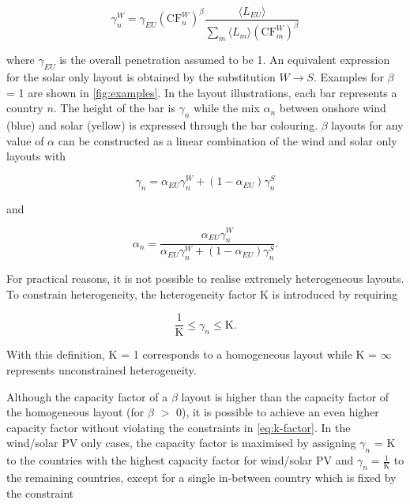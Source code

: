 \documentclass[a4paper, 5p, sort&compress]{elsarticle}%
\newcommand{\paren}[1]{\left(#1\right)}
\begin{document}
\begin{equation}
  \label{eq:8}
  \gamma_{n}^{W} = \gamma_{EU} \paren{\text{CF}^{W}_{n}}^{\beta} \frac{\langle L_{EU}
    \rangle}{\sum_{m} \langle L_{m}
    \rangle \paren{\text{CF}^{W}_{m}}^{\beta}}
\end{equation}

where $\gamma_{EU}$ is the overall penetration assumed to be 1. An equivalent
expression for the solar only layout is obtained by the substitution
$W \to S$. Examples for $\beta$ = 1 are shown in \cref{fig:examples}. In
the layout illustrations, each bar represents a country $n$. The
height of the bar is $\gamma_{n}$ while the mix $\alpha_{n}$ between onshore
wind (blue) and solar (yellow) is expressed through the bar
colouring. $\beta$ layouts for any value of $\alpha$ can be constructed as a
linear combination of the wind and solar only layouts with


\begin{equation}
  \label{eq:9}
  \gamma_{n} = \alpha_{EU} \gamma^{W}_{n} + (1-\alpha_{EU}) \gamma^{S}_{n} 
\end{equation}

and

\begin{equation}
  \label{eq:9}
  \alpha_{n} = \frac{\alpha_{EU} \gamma_{n}^{W}}{\alpha_{EU} \gamma_{n}^{W} + (1-\alpha_{EU}) \gamma_{n}^{S}} .
\end{equation}


For practical reasons, it is not possible to realise extremely
heterogeneous layouts. To constrain heterogeneity, the heterogeneity
factor K is introduced by requiring

\begin{equation}
  \label{eq:k-factor}
  \frac{1}{\text{K}} \leq \gamma_{n} \leq \text{K} .
\end{equation}

With this definition, K = 1 corresponds to a homogeneous layout while
K = $\infty$ represents unconstrained heterogeneity.

Although the capacity factor of a $\beta$ layout is higher than the
capacity factor of the homogeneous layout (for $\beta$ $>$ 0), it is
possible to achieve an even higher capacity factor without violating
the constraints in \cref{eq:k-factor}. In the wind/solar PV only
cases, the capacity factor is maximised by assigning $\gamma_{n}$ = K to
the countries with the highest capacity factor for wind/solar PV and
$\gamma_{n} = \frac{1}{\text{K}}$ to the remaining countries, except for a
single in-between country which is fixed by the constraint 
\end{document}
